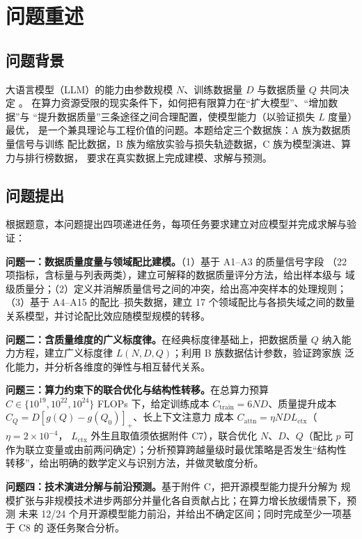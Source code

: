 \section{问题重述}

\subsection{问题背景}

大语言模型（LLM）的能力由参数规模 $N$、训练数据量 $D$ 与数据质量 $Q$ 共同决定
\cite{refBrown,refKaplan}。
在算力资源受限的现实条件下，如何把有限算力在``扩大模型''、``增加数据''与
``提升数据质量''三条途径之间合理配置，使模型能力（以验证损失 $L$ 度量）最优，
是一个兼具理论与工程价值的问题。本题给定三个数据族：A 族为数据质量信号与训练
配比数据，B 族为缩放实验与损失轨迹数据，C 族为模型演进、算力与排行榜数据，
要求在真实数据上完成建模、求解与预测。

\subsection{问题提出}

根据题意，本问题提出四项递进任务，每项任务要求建立对应模型并完成求解与验证：

\textbf{问题一：数据质量度量与领域配比建模。}（1）基于 A1--A3 的质量信号字段
（22 项指标，含标量与列表两类），建立可解释的数据质量评分方法，给出样本级与
域级质量分；（2）定义并消解质量信号之间的冲突，给出高冲突样本的处理规则；
（3）基于 A4--A15 的配比--损失数据，建立 17 个领域配比与各损失域之间的数量
关系模型，并讨论配比效应随模型规模的转移。

\textbf{问题二：含质量维度的广义标度律。}在经典标度律基础上，把数据质量 $Q$
纳入能力方程，建立广义标度律 $L(N,D,Q)$；利用 B 族数据估计参数，验证跨家族
泛化能力，并分析各维度的弹性与相互替代关系。

\textbf{问题三：算力约束下的联合优化与结构性转移。}在总算力预算
$C\in\{10^{19},10^{22},10^{24}\}$ FLOPs 下，给定训练成本
$C_{\text{train}}=6ND$、质量提升成本 $C_Q=D[g(Q)-g(Q_0)]_+$、长上下文注意力
成本 $C_{\text{attn}}=\eta N D L_{\text{ctx}}$（$\eta=2\times10^{-4}$，
$L_{\text{ctx}}$ 外生且取值须依据附件 C7），联合优化 $N$、$D$、$Q$（配比 $p$
可作为联立变量或由前两问确定）；分析预算跨越量级时最优策略是否发生``结构性
转移''，给出明确的数学定义与识别方法，并做灵敏度分析。

\textbf{问题四：技术演进分解与前沿预测。}基于附件 C，把开源模型能力提升分解为
规模扩张与非规模技术进步两部分并量化各自贡献占比；在算力增长放缓情景下，预测
未来 12/24 个月开源模型能力前沿，并给出不确定区间；同时完成至少一项基于 C8 的
逐任务聚合分析。

